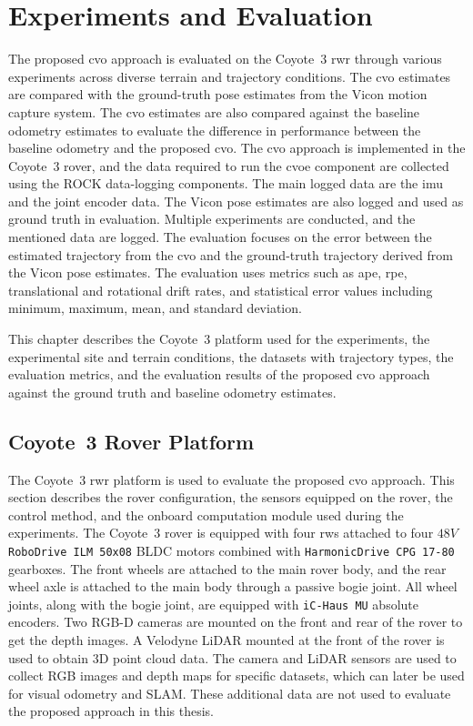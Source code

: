 \documentclass[report.tex]{subfiles}
\begin{document}
    \chapter{Experiments and Evaluation} \label{chap:experimentandevaluation}
        
    The proposed \gls{cvo} approach is evaluated on the Coyote~3 \gls{rwr} through various experiments across diverse terrain and trajectory conditions. The \gls{cvo} estimates are compared with the ground-truth pose estimates from the Vicon motion capture system. The \gls{cvo} estimates are also compared against the baseline odometry estimates to evaluate the difference in performance between the baseline odometry and the proposed \gls{cvo}. The \gls{cvo} approach is implemented in the Coyote~3 rover, and the data required to run the \gls{cvoe} component are collected using the ROCK data-logging components. The main logged data are the \gls{imu} and the joint encoder data. The Vicon pose estimates are also logged and used as ground truth in evaluation. Multiple experiments are conducted, and the mentioned data are logged. The evaluation focuses on the error between the estimated trajectory from the \gls{cvo} and the ground-truth trajectory derived from the Vicon pose estimates. The evaluation uses metrics such as \gls{ape}, \gls{rpe}, translational and rotational drift rates, and statistical error values including minimum, maximum, mean, and standard deviation. 
    
    This chapter describes the Coyote~3 platform used for the experiments, the experimental site and terrain conditions, the datasets with trajectory types, the evaluation metrics, and the evaluation results of the proposed \gls{cvo} approach against the ground truth and baseline odometry estimates.
        
    \section{Coyote~3 Rover Platform}
    
    The Coyote~3 \gls{rwr} platform is used to evaluate the proposed \gls{cvo} approach. This section describes the rover configuration, the sensors equipped on the rover, the control method, and the onboard computation module used during the experiments. The Coyote~3 rover is equipped with four \glspl{rw} attached to four $48 V$ \texttt{RoboDrive ILM 50x08} BLDC motors combined with \texttt{HarmonicDrive CPG 17-80} gearboxes. The front wheels are attached to the main rover body, and the rear wheel axle is attached to the main body through a passive bogie joint. All wheel joints, along with the bogie joint, are equipped with \texttt{iC-Haus MU} absolute encoders. Two RGB-D cameras are mounted on the front and rear of the rover to get the depth images. A Velodyne LiDAR mounted at the front of the rover is used to obtain 3D point cloud data. The camera and LiDAR sensors are used to collect RGB images and depth maps for specific datasets, which can later be used for visual odometry and SLAM. These additional data are not used to evaluate the proposed approach in this thesis.
    
\end{document}
